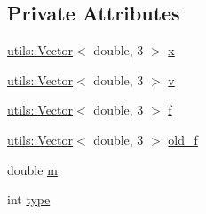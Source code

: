 \subsection*{Private Attributes}
\begin{DoxyCompactItemize}
\item 
\hyperlink{singletonutils_1_1Vector}{utils\+::\+Vector}$<$ double, 3 $>$ \hyperlink{classParticle_a3789900d6fe19a75d3a82cd5e9622c4c}{x}
\item 
\hyperlink{singletonutils_1_1Vector}{utils\+::\+Vector}$<$ double, 3 $>$ \hyperlink{classParticle_ac3669e50d83d8608d522965b9acd1d8b}{v}
\item 
\hyperlink{singletonutils_1_1Vector}{utils\+::\+Vector}$<$ double, 3 $>$ \hyperlink{classParticle_ad9aa3e171ea950b2cff1b4825e67845b}{f}
\item 
\hyperlink{singletonutils_1_1Vector}{utils\+::\+Vector}$<$ double, 3 $>$ \hyperlink{classParticle_ad9281e33474f23f7261f28848affc4a4}{old\+\_\+f}
\item 
double \hyperlink{classParticle_aedcc7e1bc53b0e2b1a4a07c9a1b47563}{m}
\item 
int \hyperlink{classParticle_a2b73dd42bcd56ba2e7ffeb0a5515a866}{type}
\end{DoxyCompactItemize}


